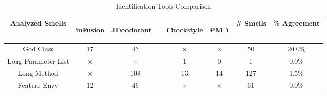 \documentclass[conference]{IEEEtran}
\begin{document}
\begin{table}[h]
\centering
\caption{Identification Tools Comparison}
\label{tab:motivation}
\begin{tabular}{|c||c|c|c|c|c|c|}
\hline
{Analyzed Smells}& \multicolumn{1}{l|}{\begin{sideways}inFusion\end{sideways}} & \multicolumn{1}{l|}{\begin{sideways}JDeodorant~~\end{sideways}} & \multicolumn{1}{l|}{\begin{sideways}Checkstyle\end{sideways}} & \multicolumn{1}{l|}{\begin{sideways}PMD\end{sideways}} & \multicolumn{1}{l|}{ \# Smells} & \multicolumn{1}{l|}{ \% Agreement} \\ \hline \hline
God Class	& 17 & 43  & \begin{math}\times\end{math} &  \begin{math}\times\end{math} & 50 & 20.0\%                \\ \hline
Long Parameter List & \begin{math}\times\end{math} & \begin{math}\times\end{math}   & 1 & 0   & 1 & 0.0\%                  \\ \hline
Long Method     & \begin{math}\times\end{math} & 108   & 13  	& 14  &   127 &   1.5\%    \\ \hline
Feature Envy     & 12 & 49 & \begin{math}\times\end{math}  & \begin{math}\times\end{math}  &   61 &   0.0\%  \\
\hline
\end{tabular}
\end{table}
\end{document}
